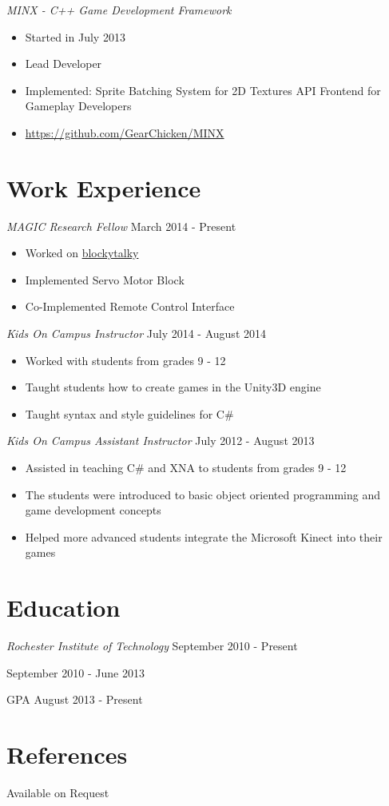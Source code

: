 \documentclass[line,margin]{res}
\begin{document}
\begin{resume}
\sl {MINX - C++ Game Development
Framework}
\begin{itemize}
\itemsep1pt\parskip0pt
\item
Started in July 2013
\item Lead Developer
\item Implemented:
\subitem Sprite Batching System for 2D Textures
\subitem API Frontend for Gameplay Developers
\item
\url{https://github.com/GearChicken/MINX}
\end{itemize}

\section{Work Experience}
{\sl MAGIC Research Fellow} \hfill March 2014 - Present
\begin{itemize}
\itemsep1pt\parskip0pt
\item
  Worked on
  \href{https://github.com/liam-middlebrook/blockytalky.git}{blockytalky}
\item
  Implemented Servo Motor Block
\item
  Co-Implemented Remote Control Interface
\end{itemize}

{\sl Kids On Campus Instructor} \hfill July 2014 - August 2014
\begin{itemize}
\itemsep1pt\parskip0pt
\item
  Worked with students from grades 9 - 12
\item
  Taught students how to create games in the Unity3D engine
\item
  Taught syntax and style guidelines for C\#
\end{itemize}

{\sl Kids On Campus Assistant Instructor} \hfill July 2012 - August 2013
\begin{itemize}
\itemsep1pt\parskip0pt
\item
  Assisted in teaching C\# and XNA to students from grades 9 - 12
\item
  The students were introduced to basic object oriented programming and
  game development concepts
\item
  Helped more advanced students integrate the Microsoft Kinect into
  their games
\end{itemize}


\section{Education}
{\sl Rochester Institute of Technology} \hfill September 2010 - Present

 \hfill September 2010 - June 2013

  GPA \hfill August 2013 - Present


\section{References}
Available on Request


\end{resume}
\end{document}
